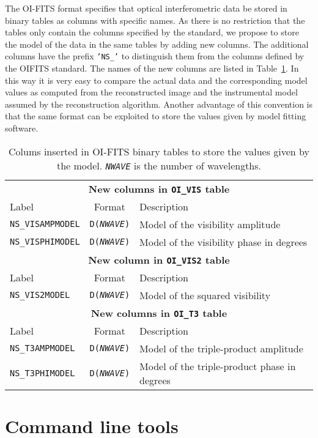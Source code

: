 \documentclass{article}
\newcommand*{\ROW}{} %
\newcommand*{\ROWTITLE}{} %
\newcommand{\STRING}[1]{\texttt{'#1'}} %
\begin{document}
The OI-FITS format \citep{Pauls_et_al-2005-oifits} specifies that
optical interferometric data be stored in binary tables as columns
with specific names.  As there is no restriction that the tables only
contain the columns specified by the standard, we propose to store the
model of the data in the same tables by adding new columns. The
additional columns have the prefix \STRING{NS\_} to distinguish them from
the columns defined by the OIFITS standard. The names of the new
columns are listed in Table~\ref{tab:model-columns}.  In this way it
is very easy to compare the actual data and the corresponding model
values as computed from the reconstructed image and the instrumental
model assumed by the reconstruction algorithm.  Another advantage of
this convention is that the same format can be exploited to store the
values given by model fitting software.

\renewcommand{\ROW}[2]{\texttt{#1} & \texttt{D(\textsl{NWAVE})} & #2 \\}
\renewcommand{\ROWTITLE}[1]{\multicolumn{3}{c}{\textbf{#1}}\\}

\begin{table}
\caption{Colums inserted in OI-FITS binary tables to store the values given by
the model.  \texttt{\textsl{NWAVE}} is the number of wavelengths.
\label{tab:model-columns}}
\begin{tabular}{lcl}
\hline
\hline
\ROWTITLE{New columns in \texttt{OI\_VIS} table}
Label & Format & Description \\
\hline
\ROW{NS\_VISAMPMODEL}{Model of the visibility amplitude}
\ROW{NS\_VISPHIMODEL}{Model of the visibility phase in degrees}
\hline
\hline
\ROWTITLE{New column in \texttt{OI\_VIS2} table}
Label & Format & Description \\
\hline
\ROW{NS\_VIS2MODEL}{Model of the squared visibility}
\hline
\hline
\ROWTITLE{New columns in \texttt{OI\_T3} table}
Label & Format & Description \\
\hline
\ROW{NS\_T3AMPMODEL}{Model of the triple-product amplitude}
\ROW{NS\_T3PHIMODEL}{Model of the triple-product phase in degrees}
\hline
\end{tabular}
\end{table}

\section{Command line tools}
\end{document}
